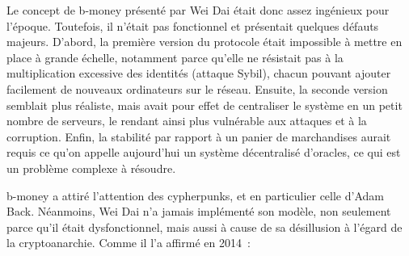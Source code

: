 Le concept de b-money présenté par Wei Dai était donc assez ingénieux pour l'époque. Toutefois, il n'était pas fonctionnel et présentait quelques défauts majeurs. D'abord, la première version du protocole était impossible à mettre en place à grande échelle, notamment parce qu'elle ne résistait pas à la multiplication excessive des identités (attaque Sybil), chacun pouvant ajouter facilement de nouveaux ordinateurs sur le réseau. Ensuite, la seconde version semblait plus réaliste, mais avait pour effet de centraliser le système en un petit nombre de serveurs, le rendant ainsi plus vulnérable aux attaques et à la corruption. Enfin, la stabilité par rapport à un panier de marchandises aurait requis ce qu'on appelle aujourd'hui un système décentralisé d'oracles, ce qui est un problème complexe à résoudre. %

b-money a attiré l'attention des cypherpunks, et en particulier celle d'Adam Back. Néanmoins, Wei Dai n'a jamais implémenté son modèle, non seulement parce qu'il était dysfonctionnel, mais aussi à cause de sa désillusion à l'égard de la cryptoanarchie. Comme il l'a affirmé en 2014~:

